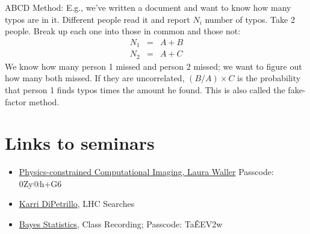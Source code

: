 \documentclass[prd,amsmath,aps,floats,amssymb, floatfix,
  superscriptaddress,nofootinbib]{revtex4-1}
\def\vs{\nonumber\\}
\numberwithin{equation}{section}
\def\bea{\begin{eqnarray}}
\def\eea{\end{eqnarray}}
\newcommand\bei{\begin{itemize}}
\newcommand\eei{\end{itemize}}
\begin{document}
  ABCD Method: E.g., we've written a document and want to know how many typos are in it. Different people read it and report $N_i$ number of typos. Take 2 people. Break up each one into those in common and those not:
  \bea
  N_1&=&A+B\vs
  N_2&=&A+C
  \eea
  We know how many person 1 missed and person 2 missed; we want to figure out how many both missed. If they are uncorrelated, $(B/A)\times C$ is the probability that person 1 finds typos times the amount he found. This is also called the fake-factor method.
 
 \section{Links to seminars}
 
 \bei
\item  \href{https://cmu.zoom.us/rec/share/2m9MSmtj6mbf7A_ueusvKnZIFItFV3HPI7QVJ7zlfSCCZGRzBt3iTHKs_fcKLJKx.3rNWZExDpw63YeTg}{Physics-constrained Computational Imaging, Laura Waller} Passcode: 0Zy@h+G6
 \item \href{https://cmu.box.com/s/s16xxmvut99n1fl73yooxq7kwxe6sgfo}{Karri DiPetrillo}, LHC Searches
\item \href{https://cmu.zoom.us/rec/share/tHqLS0TsN0H399MCClI3fv2_dWaraXiiAAA5R3grrEWrA-4OZjclNI4GP_njf_TW.mPFln3zm5t0xyHP7}{Bayes Statistics}, Class Recording;  Passcode: Ta\^EEV2w 
\eei
\end{document}
